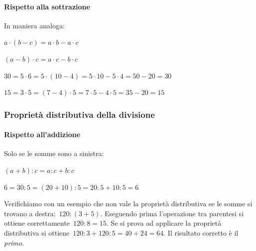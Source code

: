 \paragraph{Rispetto alla sottrazione}
In maniera analoga:


\vspace{.5em}
\begin{minipage}{.38\textwidth}
 \(a\cdot (b-c) = a\cdot b - a\cdot c\)
 
 \((a-b)\cdot c = a\cdot c - b\cdot c\)
\end{minipage}
\hfill
\begin{minipage}{.58\textwidth}
 \(30 = 5 \cdot 6 = 5\cdot(10-4) = 5\cdot 10 - 5\cdot 4 = 50 - 20 = 30\)
 
 \(15 = 3 \cdot 5 = (7-4) \cdot 5 = 7\cdot 5 - 4\cdot 5 = 35 - 20 = 15\)
\end{minipage}

\subsubsection{Proprietà distributiva della divisione}

\paragraph{Rispetto all'addizione}
Solo se le somme sono a sinistra:

\vspace{.5em}
\begin{minipage}{.38\textwidth}
 \((a+b): c=a:c+b:c\)
\end{minipage}
\hfill
\begin{minipage}{.58\textwidth}
 \(6 = 30 : 5 = (20+10):5=20:5+10:5=6\)
\end{minipage}

Verifichiamo con un esempio che non vale la proprietà distributiva se le 
somme 
si trovano a destra:~\(120:(3+5)\).
Eseguendo prima l'operazione tra parentesi si ottiene 
correttamente~\(120:8=15\). Se si prova ad applicare
la proprietà distributiva si ottiene~\(120:3+120:5=40+24=64\). 
Il risultato corretto è il \emph{primo}.

